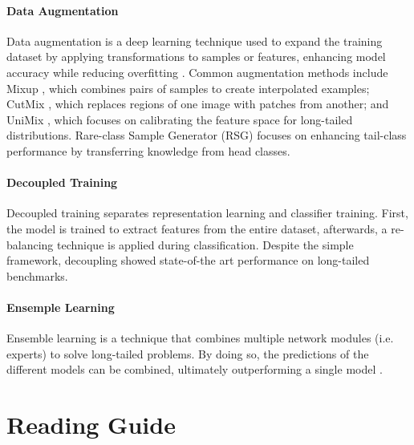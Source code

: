 \paragraph{Data Augmentation}
Data augmentation is a deep learning technique used to expand the training dataset by applying transformations to samples or features, enhancing model accuracy while reducing overfitting \cite{perez2017effectivenessdataaugmentationimage,shorten2019survey}. Common augmentation methods include Mixup \cite{zhang2018mixupempiricalriskminimization}, which combines pairs of samples to create interpolated examples; CutMix \cite{yun2019cutmixregularizationstrategytrain}, which replaces regions of one image with patches from another; and UniMix \cite{xu2021calibratedmodellongtailedvisual}, which focuses on calibrating the feature space for long-tailed distributions. Rare-class Sample Generator (RSG) \cite{wang2021rsgsimpleeffectivemodule} focuses on enhancing tail-class performance by transferring knowledge from head classes.

\paragraph{Decoupled Training}
Decoupled training \cite{kang2020decouplingrepresentationclassifierlongtailed} separates representation learning and classifier training. First, the model is trained to extract features from the entire dataset, afterwards, a re-balancing technique is applied during classification. Despite the simple framework, decoupling showed state-of-the art performance on long-tailed benchmarks.

\paragraph{Ensemple Learning}
Ensemble learning is a technique that combines multiple network modules (i.e. experts) to solve long-tailed problems. By doing so, the predictions of the different models can be combined, ultimately outperforming a single model \cite{zhou2020bbnbilateralbranchnetworkcumulative,wang2022longtailedrecognitionroutingdiverse}.


\section{Reading Guide}

